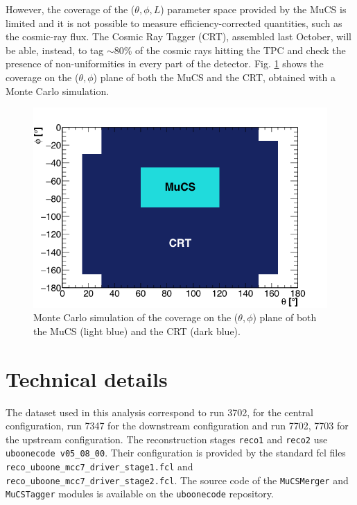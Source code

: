\documentclass[a4paper]{scrartcl}
\begin{document}
However, the coverage of the ($\theta, \phi, L$) parameter space provided by the MuCS is limited and it is not possible to measure efficiency-corrected quantities, such as the cosmic-ray flux. The Cosmic Ray Tagger (CRT), assembled last October, will be able, instead, to tag $\sim$80\% of the cosmic rays hitting the TPC and check the presence of non-uniformities in every part of the detector. Fig. \ref{fig:crt} shows the coverage on the ($\theta,\phi$) plane of both the MuCS and the CRT, obtained with a Monte Carlo simulation.

\begin{figure}[htbp]
  \begin{center}
    \includegraphics[width=0.7\linewidth]{figures/crt.png}
    \caption{Monte Carlo simulation of the coverage on the ($\theta,\phi$) plane of both the MuCS (light blue) and the CRT (dark blue).} \label{fig:crt}
  \end{center}
\end{figure}

\clearpage{}

\appendix

\section{Technical details}
The dataset used in this analysis correspond to run 3702, for the central configuration, run 7347 for the downstream configuration and run 7702, 7703 for the upstream configuration. The reconstruction stages \texttt{reco1} and \texttt{reco2} use \texttt{uboonecode v05\_08\_00}. Their configuration is provided by the standard fcl files \texttt{reco\_uboone\_mcc7\_driver\_stage1.fcl} and \texttt{reco\_uboone\_mcc7\_driver\_stage2.fcl}. The source code of the \texttt{MuCSMerger} and \texttt{MuCSTagger} modules is available on the \texttt{uboonecode} repository.
\end{document}
